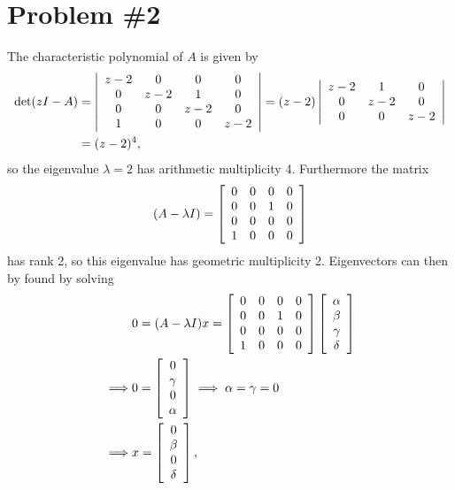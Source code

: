 \documentclass{article}
\begin{document}
\pagebreak

\section*{Problem \#2}

The characteristic polynomial of $A$ is given by
\begin{align*}
\det (zI - A) &=
\left|\begin{array}{c c c c}
z - 2 & 0     & 0     & 0 \\
0     & z - 2 & 1     & 0 \\
0     & 0     & z - 2 & 0 \\
1     & 0     & 0     & z - 2
\end{array}\right|
=
(z - 2)
\left|\begin{array}{c c c}
z - 2 & 1     & 0 \\
0     & z - 2 & 0 \\
0     & 0     & z - 2
\end{array}\right| \\
&=
(z - 2)^4,
\end{align*}
so the eigenvalue $\lambda = 2$ has arithmetic multiplicity
4. Furthermore the matrix
\begin{align*}
(A - \lambda I) =
\left[\begin{array}{c c c c}
0 & 0 & 0 & 0 \\
0 & 0 & 1 & 0 \\
0 & 0 & 0 & 0 \\
1 & 0 & 0 & 0
\end{array}\right]
\end{align*}
has rank 2, so this eigenvalue has geometric multiplicity 2.
Eigenvectors can then by found by solving
\begin{align*}
& 0 = (A - \lambda I)x =
  \left[\begin{array}{c c c c}
    0 & 0 & 0 & 0 \\
    0 & 0 & 1 & 0 \\
    0 & 0 & 0 & 0 \\
    1 & 0 & 0 & 0
  \end{array}\right]
  \left[\begin{array}{c}
    \alpha \\ \beta \\ \gamma \\ \delta
  \end{array}\right] \\
\implies &
0 =
  \left[\begin{array}{c}
    0 \\ \gamma \\ 0 \\ \alpha
  \end{array}\right]
\implies
  \alpha = \gamma = 0 \\
\implies &
  x = \left[\begin{array}{c}
    0 \\ \beta \\ 0 \\ \delta
  \end{array}\right],
\end{align*}
\end{document}

